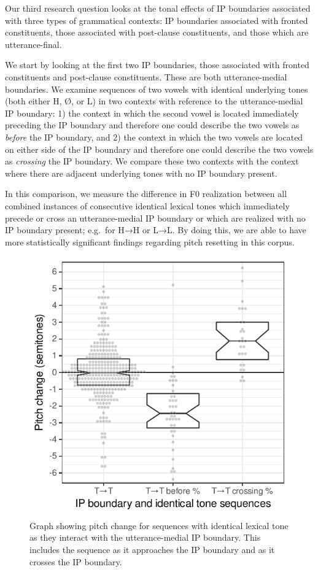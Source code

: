 \documentclass[
  11pt,
  b5paper,
]{article}
\begin{document}
Our third research question looks at the tonal effects of IP boundaries
associated with three types of grammatical contexts: IP boundaries
associated with fronted constituents, those associated with post-clause
constituents, and those which are utterance-final.

We start by looking at the first two IP boundaries, those associated
with fronted constituents and post-clause constituents. These are both
utterance-medial boundaries. We examine sequences of two vowels with
identical underlying tones (both either H, Ø, or L) in two contexts with
reference to the utterance-medial IP boundary: 1) the context in which
the second vowel is located immediately preceding the IP boundary and
therefore one could describe the two vowels as \emph{before} the IP
boundary, and 2) the context in which the two vowels are located on
either side of the IP boundary and therefore one could describe the two
vowels as \emph{crossing} the IP boundary. We compare these two contexts
with the context where there are adjacent underlying tones with no IP
boundary present.

In this comparison, we measure the difference in F0 realization between
all combined instances of consecutive identical lexical tones which
immediately precede or cross an utterance-medial IP boundary or which
are realized with no IP boundary present; e.g.~for H→H or L→L. By doing
this, we are able to have more statistically significant findings
regarding pitch resetting in this corpus.

\begin{figure}
\centering
\includegraphics{figure/plot-transitions-1.pdf}
\caption{Graph showing pitch change for sequences with identical lexical
tone as they interact with the utterance-medial IP boundary. This
includes the sequence as it approaches the IP boundary and as it crosses
the IP
boundary.\label{fig:vowel_sequences_and_medial_boundaries_manual}}
\end{figure}
\end{document}
